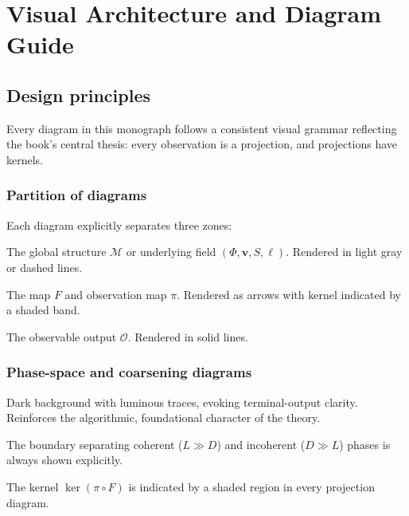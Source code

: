 
\chapter*{Visual Architecture and Diagram Guide}

\section*{Design principles}

Every diagram in this monograph follows a consistent visual
grammar reflecting the book's central thesis:
every observation is a projection, and projections have kernels.

\subsection*{Partition of diagrams}

Each diagram explicitly separates three zones:
\begin{description}[leftmargin=2cm]
  \item[Hidden layer] The global structure $\mathcal{M}$
    or underlying field $(\Phi, \mathbf{v}, S, \ell)$.
    Rendered in light gray or dashed lines.
  \item[Projection layer] The map $F$ and observation map $\pi$.
    Rendered as arrows with kernel indicated by a shaded band.
  \item[Observable layer] The observable output $\mathcal{O}$.
    Rendered in solid lines.
\end{description}

\subsection*{Phase-space and coarsening diagrams}

\begin{description}[leftmargin=2cm]
  \item[High contrast] Dark background with luminous traces,
    evoking terminal-output clarity.
    Reinforces the algorithmic, foundational character of the theory.
  \item[Boundary encoding] The boundary separating coherent
    ($L \gg D$) and incoherent ($D \gg L$) phases is always
    shown explicitly.
  \item[Kernel shading] The kernel $\ker(\pi \circ F)$ is
    indicated by a shaded region in every projection diagram.
\end{description}

